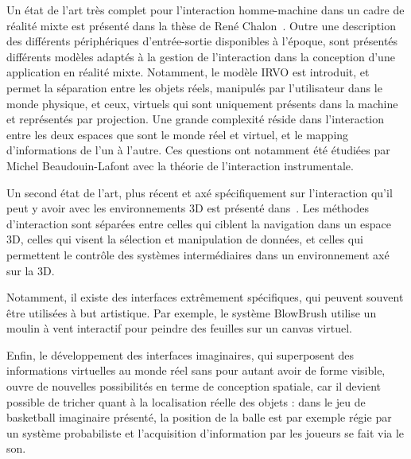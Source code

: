 \documentclass[french,12pt]{article}
\begin{document}
Un état de l'art très complet pour l'interaction homme-machine dans un cadre de réalité mixte est présenté dans la thèse de René Chalon~\cite{chalon_realite_2004}. Outre une description des différents périphériques d'entrée-sortie disponibles à l'époque, sont présentés différents modèles adaptés à la gestion de l'interaction dans la conception d'une application en réalité mixte. Notamment, le modèle IRVO est introduit, et permet la séparation entre les objets réels, manipulés par l'utilisateur dans le monde physique, et ceux, virtuels qui sont uniquement présents dans la machine et représentés par projection. Une grande complexité réside dans l'interaction entre les deux espaces que sont le monde réel et virtuel, et le mapping d'informations de l'un à l'autre. Ces questions ont notamment été étudiées par Michel Beaudouin-Lafont avec la théorie de l'interaction instrumentale.

Un second état de l'art, plus récent et axé spécifiquement sur l'interaction qu'il peut y avoir avec les environnements 3D est présenté dans~\cite{jankowski_advances_2015}. Les méthodes d'interaction sont séparées entre celles qui ciblent la navigation dans un espace 3D, celles qui visent la sélection et manipulation de données, et celles qui permettent le contrôle des systèmes intermédiaires dans un environnement axé sur la 3D. 

Notamment, il existe des interfaces extrêmement spécifiques, qui peuvent souvent être utilisées à but artistique. Par exemple, le système BlowBrush\cite{shen_blowbrush:_2014} utilise un moulin à vent interactif pour peindre des feuilles sur un canvas virtuel.

Enfin, le développement des interfaces imaginaires\cite{gustafson_imaginary_2010}, qui superposent des informations virtuelles au monde réel sans pour autant avoir de forme visible, ouvre de nouvelles possibilités en terme de conception spatiale, car il devient possible de tricher quant à la localisation réelle des objets : dans le jeu de basketball imaginaire présenté, la position de la balle est par exemple régie par un système probabiliste et l'acquisition d'information par les joueurs se fait via le son.
\end{document}
